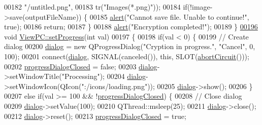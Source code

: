 \begin{DoxyCode}
00182                                \textcolor{stringliteral}{"/untitled.png"},
00183                                tr(\textcolor{stringliteral}{"Images(*.png)"}));
00184     \textcolor{keywordflow}{if}(!image->save(outputFileName)) \{
00185         \hyperlink{class_view_p_c_a7c467169467789561078abc9d4fe57bd}{alert}(\textcolor{stringliteral}{"Cannot save file. Unable to continue!"}, \textcolor{keyword}{true});
00186         \textcolor{keywordflow}{return};
00187     \}
00188     \hyperlink{class_view_p_c_a7c467169467789561078abc9d4fe57bd}{alert}(\textcolor{stringliteral}{"Encryption completed!"});
00189 \}
\hypertarget{viewpc_8cpp_source_l00196}{}\hyperlink{class_view_p_c_a9c32a1fdb6ead84e5ada8fba8860c7ed}{00196} \textcolor{keywordtype}{void} \hyperlink{class_view_p_c_a9c32a1fdb6ead84e5ada8fba8860c7ed}{ViewPC::setProgress}(\textcolor{keywordtype}{int} val)
00197 \{
00198     \textcolor{keywordflow}{if}(val < 0) \{
00199         \textcolor{comment}{// Create dialog}
00200         \hyperlink{class_view_p_c_a31abbb470fe329b44e6ffee202b903ca}{dialog} = \textcolor{keyword}{new} QProgressDialog(\textcolor{stringliteral}{"Cryption in progress."}, \textcolor{stringliteral}{"Cancel"}, 0, 100);
00201         connect(\hyperlink{class_view_p_c_a31abbb470fe329b44e6ffee202b903ca}{dialog}, SIGNAL(canceled()), \textcolor{keyword}{this}, SLOT(\hyperlink{class_view_p_c_ad7ba2fcf1d17862de15e32432823f7b0}{abortCircuit}()));
00202         \hyperlink{class_view_p_c_add8c82aa2b0b934212aa5bde9277ab36}{progressDialogClosed} = \textcolor{keyword}{false};
00203         \hyperlink{class_view_p_c_a31abbb470fe329b44e6ffee202b903ca}{dialog}->setWindowTitle(\textcolor{stringliteral}{"Processing"});
00204         \hyperlink{class_view_p_c_a31abbb470fe329b44e6ffee202b903ca}{dialog}->setWindowIcon(QIcon(\textcolor{stringliteral}{":/icons/loading.png"}));
00205         \hyperlink{class_view_p_c_a31abbb470fe329b44e6ffee202b903ca}{dialog}->show();
00206     \}
00207     \textcolor{keywordflow}{else} \textcolor{keywordflow}{if}(val >= 100 && !\hyperlink{class_view_p_c_add8c82aa2b0b934212aa5bde9277ab36}{progressDialogClosed}) \{
00208         \textcolor{comment}{// Close dialog}
00209         \hyperlink{class_view_p_c_a31abbb470fe329b44e6ffee202b903ca}{dialog}->setValue(100);
00210         QThread::msleep(25);
00211         \hyperlink{class_view_p_c_a31abbb470fe329b44e6ffee202b903ca}{dialog}->close();
00212         \hyperlink{class_view_p_c_a31abbb470fe329b44e6ffee202b903ca}{dialog}->reset();
00213         \hyperlink{class_view_p_c_add8c82aa2b0b934212aa5bde9277ab36}{progressDialogClosed} = \textcolor{keyword}{true};

\end{DoxyCode}
